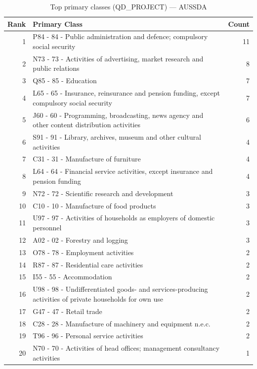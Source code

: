 \begin{table}[H]
    \centering
    \begin{tabular}{r p{10cm} r}
    \hline
    \textbf{Rank} & \textbf{Primary Class} & \textbf{Count} \\
    \hline
    1 & P84 - 84 - Public administration and defence; compulsory social security & 11 \\
    2 & N73 - 73 - Activities of advertising, market research and public relations & 8 \\
    3 & Q85 - 85 - Education & 7 \\
    4 & L65 - 65 - Insurance, reinsurance and pension funding, except compulsory social security & 7 \\
    5 & J60 - 60 - Programming, broadcasting, news agency and other content distribution activities & 6 \\
    6 & S91 - 91 - Library, archives, museum and other cultural activities & 4 \\
    7 & C31 - 31 - Manufacture of furniture & 4 \\
    8 & L64 - 64 - Financial service activities, except insurance and pension funding & 4 \\
    9 & N72 - 72 - Scientific research and development & 3 \\
    10 & C10 - 10 - Manufacture of food products & 3 \\
    11 & U97 - 97 - Activities of households as employers of domestic personnel & 3 \\
    12 & A02 - 02 - Forestry and logging & 3 \\
    13 & O78 - 78 - Employment activities & 2 \\
    14 & R87 - 87 - Residential care activities & 2 \\
    15 & I55 - 55 - Accommodation & 2 \\
    16 & U98 - 98 - Undifferentiated goods- and services-producing activities of private households for own use & 2 \\
    17 & G47 - 47 - Retail trade & 2 \\
    18 & C28 - 28 - Manufacture of machinery and equipment n.e.c. & 2 \\
    19 & T96 - 96 - Personal service activities & 2 \\
    20 & N70 - 70 - Activities of head offices; management consultancy activities & 1 \\
    \hline
    \end{tabular}
    \caption{Top primary classes (QD\_PROJECT) --- AUSSDA}
\end{table}

